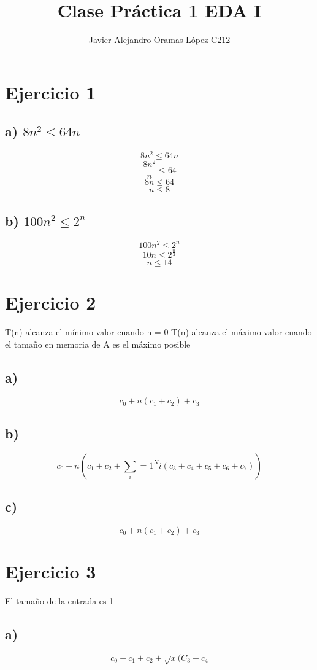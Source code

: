 \documentclass[10pt,a4paper]{article}
\author{Javier Alejandro Oramas L\'opez C212}
\title{Clase Pr\'actica 1 EDA I}
\begin{document}
    \maketitle
    \section{Ejercicio 1}
        \subsection{a) $ 8n^{2} \leq 64n $} 
            \begin{enumerate}
                $$ 8n^{2} \leq 64n $$
                $$ \frac{8n^{2}}{n} \leq 64 $$
                $$ 8n \leq 64$$
                $$ n \leq 8 $$
            \end{enumerate}
        
         \subsection{b) $ 100n^2 \leq 2^n $}
            $$ 100n^2 \leq 2^n $$
            $$ 10n \leq 2^{\frac{n}{2}} $$
            $$ n \leq 14 $$
            
    \section{Ejercicio 2}
        T(n) alcanza el m\'inimo valor cuando n = 0
        T(n) alcanza el m\'aximo valor cuando el tama\~no en memoria de A es el m\'aximo posible
        \subsection{a)}
            $$ c_{0} + n( c_{1} + c_{2}) +c_{3} $$
        \subsection{b)}
            $$ c_{0} + n(c_{1} + c_{2} + \sum_i=1^{N} i (c_{3} +c_{4} + c_{5} +c_{6} +c_{7} )) $$
        \subsection{c)}
            $$ c_{0} + n(c_{1} + c_{2}) + c_{3} $$
    \section{Ejercicio 3}
        El tama\~no de la entrada es 1
        \subsection{a)}
            $$ c_{0} + c_{1} + c_{2} + \sqrt{x}( C_{3} + c_{4} $$
\end{document}
